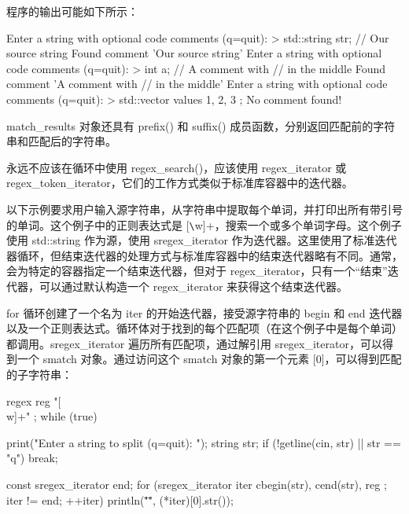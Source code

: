 
程序的输出可能如下所示：

\begin{shell}
Enter a string with optional code comments (q=quit):
> std::string str; // Our source string
  Found comment 'Our source string'
Enter a string with optional code comments (q=quit):
> int a; // A comment with // in the middle
  Found comment 'A comment with // in the middle'
Enter a string with optional code comments (q=quit):
> std::vector values { 1, 2, 3 };
  No comment found!
\end{shell}

match\_results 对象还具有 prefix() 和 suffix() 成员函数，分别返回匹配前的字符串和匹配后的字符串。


永远不应该在循环中使用 regex\_search()，应该使用 regex\_iterator 或 regex\_token\_iterator，它们的工作方式类似于标准库容器中的迭代器。


以下示例要求用户输入源字符串，从字符串中提取每个单词，并打印出所有带引号的单词。这个例子中的正则表达式是 [\verb|\|w]+，搜索一个或多个单词字母。这个例子使用 std::string 作为源，使用 sregex\_iterator 作为迭代器。这里使用了标准迭代器循环，但结束迭代器的处理方式与标准库容器中的结束迭代器略有不同。通常，会为特定的容器指定一个结束迭代器，但对于 regex\_iterator，只有一个“结束”迭代器，可以通过默认构造一个 regex\_iterator 来获得这个结束迭代器。

for 循环创建了一个名为 iter 的开始迭代器，接受源字符串的 begin 和 end 迭代器以及一个正则表达式。循环体对于找到的每个匹配项（在这个例子中是每个单词）都调用。sregex\_iterator 遍历所有匹配项，通过解引用 sregex\_iterator，可以得到一个 smatch 对象。通过访问这个 smatch 对象的第一个元素 [0]，可以得到匹配的子字符串：

\begin{cpp}
regex reg { "[\\w]+" };
while (true) {
    print("Enter a string to split (q=quit): ");
    string str;
    if (!getline(cin, str) || str == "q") { break; }

    const sregex_iterator end;
    for (sregex_iterator iter { cbegin(str), cend(str), reg };
    iter != end; ++iter) {
        println("\"{}\"", (*iter)[0].str());
    }
}
\end{cpp}

